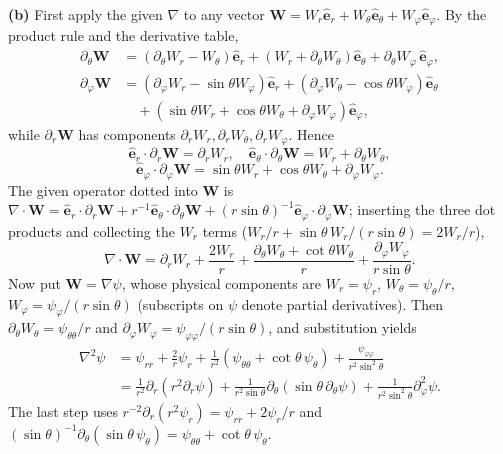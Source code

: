 \textbf{(b)} First apply the given $\nabla$ to any vector
$\mathbf W=W_r\hat{\mathbf e}_r+W_\theta\hat{\mathbf e}_\theta+
W_\varphi\hat{\mathbf e}_\varphi$.
By the product rule and the derivative table,
\[
\begin{aligned}
\partial_\theta\mathbf W&=(\partial_\theta W_r-W_\theta)\hat{\mathbf e}_r
+(W_r+\partial_\theta W_\theta)\hat{\mathbf e}_\theta
+\partial_\theta W_\varphi\,\hat{\mathbf e}_\varphi,\\
\partial_\varphi\mathbf W&=(\partial_\varphi W_r-\sin\theta W_\varphi)\hat{\mathbf e}_r
+(\partial_\varphi W_\theta-\cos\theta W_\varphi)\hat{\mathbf e}_\theta\\
&\quad+(\sin\theta W_r+\cos\theta W_\theta+\partial_\varphi W_\varphi)
\hat{\mathbf e}_\varphi,
\end{aligned}
\]
while $\partial_r\mathbf W$ has components $\partial_rW_r,\partial_rW_\theta,
\partial_rW_\varphi$. Hence
\[
\hat{\mathbf e}_r\cdot\partial_r\mathbf W=\partial_rW_r,\quad
\hat{\mathbf e}_\theta\cdot\partial_\theta\mathbf W=W_r+\partial_\theta W_\theta,
\]
\[
\hat{\mathbf e}_\varphi\cdot\partial_\varphi\mathbf W
=\sin\theta W_r+\cos\theta W_\theta+\partial_\varphi W_\varphi.
\]
The given operator dotted into $\mathbf W$ is
$\nabla\cdot\mathbf W=\hat{\mathbf e}_r\cdot\partial_r\mathbf W
+r^{-1}\hat{\mathbf e}_\theta\cdot\partial_\theta\mathbf W
+(r\sin\theta)^{-1}\hat{\mathbf e}_\varphi\cdot\partial_\varphi\mathbf W$;
inserting the three dot products and collecting the $W_r$ terms
($W_r/r+\sin\theta\,W_r/(r\sin\theta)=2W_r/r$),
\[
\nabla\cdot\mathbf W=\partial_rW_r+\frac{2W_r}{r}
+\frac{\partial_\theta W_\theta+\cot\theta W_\theta}{r}
+\frac{\partial_\varphi W_\varphi}{r\sin\theta}.
\]
Now put $\mathbf W=\nabla\psi$, whose physical components are
$W_r=\psi_r$, $W_\theta=\psi_\theta/r$, $W_\varphi=\psi_\varphi/(r\sin\theta)$
(subscripts on $\psi$ denote partial derivatives).
Then $\partial_\theta W_\theta=\psi_{\theta\theta}/r$ and
$\partial_\varphi W_\varphi=\psi_{\varphi\varphi}/(r\sin\theta)$, and
substitution yields
\[
\begin{aligned}
\nabla^2\psi
&=\psi_{rr}+\frac2r\psi_r+
\frac1{r^2}(\psi_{\theta\theta}+\cot\theta\,\psi_\theta)
+\frac{\psi_{\varphi\varphi}}{r^2\sin^2\theta}\\
&=\boxed{\frac1{r^2}\partial_r(r^2\partial_r\psi)
+\frac1{r^2\sin\theta}\partial_\theta(\sin\theta\,\partial_\theta\psi)
+\frac1{r^2\sin^2\theta}\partial_\varphi^2\psi}.
\end{aligned}
\]
The last step uses
$r^{-2}\partial_r(r^2\psi_r)=\psi_{rr}+2\psi_r/r$ and
$(\sin\theta)^{-1}\partial_\theta(\sin\theta\,\psi_\theta)
=\psi_{\theta\theta}+\cot\theta\,\psi_\theta$.

